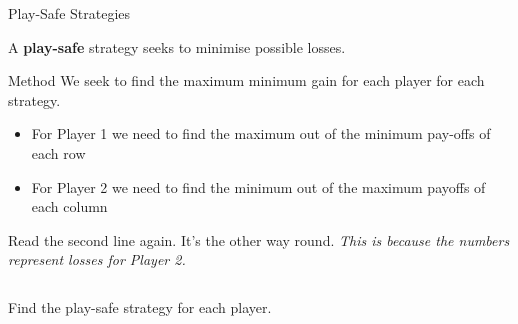 \documentclass[8pt]{beamer}
\begin{document}
\begin{frame}[shrink=10]{Play-Safe Strategies}
	\begin{definition}
		A \textbf{play-safe} strategy seeks to minimise possible losses.
	\end{definition}
	\begin{block}{Method}
		We seek to find the maximum minimum gain for each player for each strategy.
		\begin{itemize}
			\item For Player 1 we need to find the maximum out of the minimum pay-offs of each row
			\item For Player 2 we need to find the minimum out of the maximum payoffs of each column
		\end{itemize}
		\alert<1>{Read the second line again. It's the other way round. \emph{This is because the numbers represent losses for Player 2.}}
	\end{block}

	\begin{columns}[T]
		\begin{column}{.4\textwidth}
	\begin{problem}
		Find the play-safe strategy for each player.


\end{problem}
\end{column}
\end{columns}
\end{frame}
\end{document}
